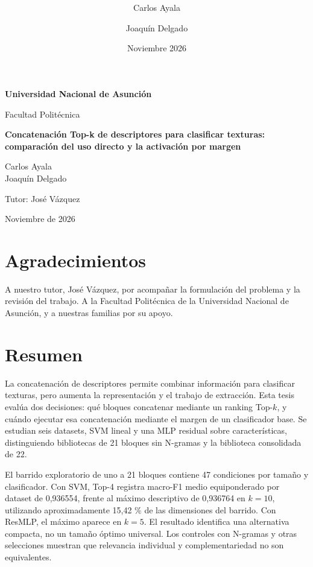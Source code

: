 \documentclass[12pt,a4paper]{report}
\title{\textbf{\titulotesis}}
\author{Carlos Ayala \and Joaquín Delgado}
\date{Noviembre 2026}
\newcommand{\titulotesis}{Concatenación Top-k de descriptores para clasificar texturas: comparación del uso directo y la activación por margen}
\begin{document}
\hypersetup{pageanchor=false}
\begin{titlepage}
\begin{center}
\vspace*{1.4cm}
{\Large\textbf{Universidad Nacional de Asunción}\par}
\vspace{0.4cm}
{\large Facultad Politécnica\par}
\vspace{1.7cm}
{\LARGE\bfseries\titulotesis\par}
\vspace{1.5cm}
{\large Carlos Ayala\\Joaquín Delgado\par}
\vspace{1.1cm}
{\large Tutor: José Vázquez\par}
\vfill
{\large Noviembre de 2026\par}
\end{center}
\end{titlepage}
\clearpage
{}
\hypersetup{pageanchor=true}

\chapter*{Agradecimientos}
A nuestro tutor, José Vázquez, por acompañar la formulación del problema y la revisión del trabajo. A la Facultad Politécnica de la Universidad Nacional de Asunción, y a nuestras familias por su apoyo.

\chapter*{Resumen}
La concatenación de descriptores permite combinar información para clasificar texturas, pero aumenta la representación y el trabajo de extracción. Esta tesis evalúa dos decisiones: qué bloques concatenar mediante un ranking Top-\(k\), y cuándo ejecutar esa concatenación mediante el margen de un clasificador base. Se estudian seis datasets, SVM lineal y una MLP residual sobre características, distinguiendo bibliotecas de 21 bloques sin N-gramas y la biblioteca consolidada de 22.

El barrido exploratorio de uno a 21 bloques contiene 47 condiciones por tamaño y clasificador. Con SVM, Top-4 registra macro-F1 medio equiponderado por dataset de 0,936554, frente al máximo descriptivo de 0,936764 en \(k=10\), utilizando aproximadamente 15,42 \% de las dimensiones del barrido. Con ResMLP, el máximo aparece en \(k=5\). El resultado identifica una alternativa compacta, no un tamaño óptimo universal. Los controles con N-gramas y otras selecciones muestran que relevancia individual y complementariedad no son equivalentes.
\end{document}
